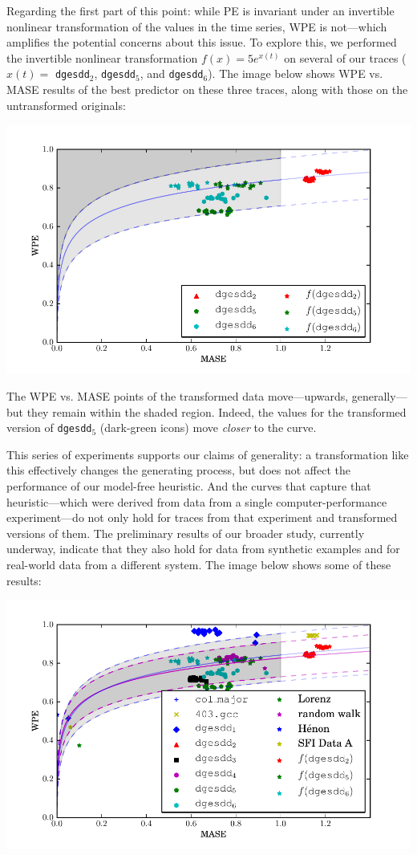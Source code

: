 \documentclass[12pt]{article}
\begin{document}
Regarding the first part of this point: while PE is invariant under an
invertible nonlinear transformation of the values in the time series,
WPE is not---which amplifies the potential concerns about this issue.
To explore this, we performed the invertible nonlinear transformation
$f(x)=5e^{x(t)}$ on several of our traces ($x(t)=$ {\tt dgesdd}$_2$,
{\tt dgesdd}$_5$, and {\tt dgesdd}$_6$).  The image below shows WPE
vs. MASE results of the best predictor on these three traces, along
with those on the untransformed originals:

\begin{center}
    \includegraphics[width=0.8\columnwidth]{figs/nonlinear_transform_data}
\end{center}

The WPE vs. MASE points of the transformed data move---upwards,
generally---but they remain within the shaded region.  Indeed, the
values for the transformed version of {\tt dgesdd}$_5$ (dark-green
icons) move {\sl closer} to the curve.

This series of experiments supports our claims of generality: a
transformation like this effectively changes the generating process,
but does not affect the performance of our model-free heuristic.  And
the curves that capture that heuristic---which were derived from data
from a single computer-performance experiment---do not only hold for
traces from that experiment and transformed versions of them.  The
preliminary results of our broader study, currently underway, indicate
that they also hold for data from synthetic examples and for
real-world data from a different system.  The image below shows some
of these results:

\begin{center}
    \includegraphics[width=0.8\columnwidth]{figs/new_prediction_vs_entropy_extras_with_nonlinear_all_points}
\end{center}
\end{document}
